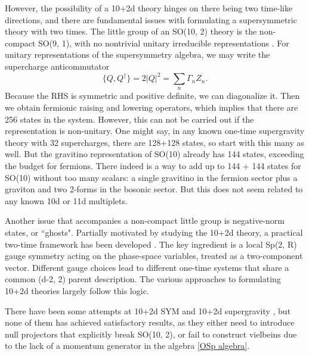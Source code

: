 However, the possibility of a 10+2d theory hinges on there being two time-like directions, and there are fundamental issues with formulating a supersymmetric theory with two times.
The little group of an SO(10, 2) theory is the non-compact SO(9, 1), with no nontrivial unitary irreducible representations \cite{Weinberg:1995mt}.
For unitary representations of the supersymmetry algebra, we may write the supercharge anticommutator 
\begin{equation}
\{Q,Q^\dagger\}=2|Q|^2=\sum_n\Gamma_n Z_n.
\end{equation}
Because the RHS is symmetric and positive definite, we can diagonalize it.
Then we obtain fermionic raising and lowering operators, which implies that there are 256 states in the system. 
However, this can not be carried out if the representation is non-unitary.
One might say, in any known one-time supergravity theory with 32 supercharges, there are 128+128 states, so start with this many as well. 
But the gravitino representation of SO(10) already has 144 states, exceeding the budget for fermions. There indeed is a way to add up to 144 + 144 states for SO(10) without too many scalars: a single gravitino in the fermion sector plus a graviton and two 2-forms in the bosonic sector. But this does not seem related to any known 10d or 11d multiplets.


Another issue that accompanies a non-compact little group is negative-norm states, or ``ghosts".
Partially motivated by studying the 10+2d theory, a practical two-time framework has been developed \cite{Bars:1998cs,Bars:1998ui,Bars:1999nk,Bars:1999uq,Bars:2000qm}. 
The key ingredient is a local Sp(2, R) gauge symmetry acting on the phase-space variables, treated as a two-component vector.
Different gauge choices lead to different one-time systems that share a common (d-2, 2) parent description.
The various approaches to formulating 10+2d theories largely follow this logic.

There have been some attempts at 10+2d SYM \cite{Nishino:1996wp,Sezgin:1997gr,Nishino:1997hk,Nishino:1997ia,Nishino:1999ck} and 10+2d supergravity \cite{Nishino:1997gq,Nishino:1997sw,Nishino:1998qn}, but none of them has achieved satisfactory results, as they either need to introduce null projectors that explicitly break SO(10, 2),
or fail to construct vielbeins due to the lack of a momentum generator \cite{Hewson:1999tf} in the algebra \eqref{OSp algebra}. 

